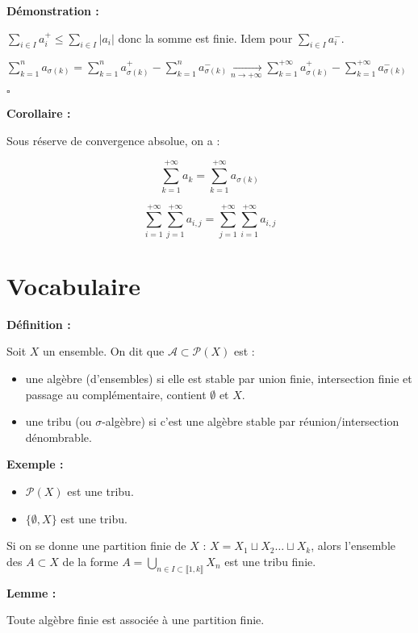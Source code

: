 \documentclass[10pt,a4paper,notitlepage ]{article}
\newenvironment{definition}{
	
	\textbf{Définition : }
}
{}
\newenvironment{demo}{

	\textbf{Démonstration :}
}{\begin{flushright}
	$\square$
\end{flushright}
}
\newenvironment{exemple}{
	
	\textbf{Exemple :} }{}
\newenvironment{corollaire}{
	\begin{tcolorbox}
		\textbf{Corollaire : }
	}
	{\end{tcolorbox}}
\newenvironment{lemme}{
	\begin{tcolorbox}
		\textbf{Lemme : }
	}
	{\end{tcolorbox}}
\begin{document}
\begin{demo}
	$\sum_{i\in I}a_i^+ \le \sum_{i\in I} |a_i|$ donc la somme est finie. Idem pour $\sum_{i\in I}a_i^-$.
	
	$\sum_{k=1}^n a_{\sigma(k)} = \sum_{k=1}^n a_{\sigma(k)}^+ - \sum_{k=1}^n a_{\sigma(k)}^- \underset{n\rightarrow +\infty}{\rightarrow}
	\sum_{k=1}^{+\infty}a_{\sigma(k)}^+ - \sum_{k=1}^{+\infty}a_{\sigma(k)}^-$
\end{demo}
\begin{corollaire}
	Sous réserve de convergence absolue, on a :
	
	\[\sum_{k=1}^{+\infty}a_k = \sum_{k=1}^{+\infty} a_{\sigma(k)}\]
	
	\[\sum_{i=1}^{+\infty}\sum_{j=1}^{+\infty}a_{i,j} =
	\sum_{j=1}^{+\infty}\sum_{i=1}^{+\infty}a_{i,j}\]
\end{corollaire}

\part*{Vocabulaire}

\begin{definition}
	Soit $X$ un ensemble. On dit que $\mathcal A \subset \mathcal P(X)$ est :
	\begin{itemize}
		\item une algèbre (d'ensembles) si elle est stable par union finie, intersection finie et passage au complémentaire, contient $\emptyset$ et $X$.
		\item une tribu (ou $\sigma$-algèbre) si c'est une algèbre stable par réunion/intersection dénombrable.
	\end{itemize}
\end{definition}

\begin{exemple}
	\begin{itemize}
		\item $\mathcal P(X)$ est une tribu.
		\item $\{\emptyset, X\}$ est une tribu.
	\end{itemize}
\end{exemple}

Si on se donne une partition finie de $X$ : $X=X_1 \sqcup X_2 \dots \sqcup X_k$, alors l'ensemble des $A \subset X$ de la forme $A=\underset{n\in I \subset \llbracket 1,k \rrbracket}{\bigcup}X_n$ est une tribu finie.

\begin{lemme}
	Toute algèbre finie est associée à une partition finie.
\end{lemme}
\end{document}
